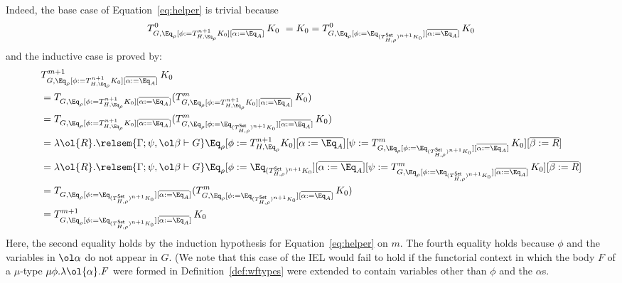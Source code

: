 \documentclass{lmcs}
\theoremstyle{plain}\newtheorem{satz}[thm]{Satz}
\newcommand{\set}{\mathsf{Set}}
\begin{document}
\begin{itemize}
\begin{itemize}
Indeed, the base case of Equation~\ref{eq:helper} is trivial because
\[T^0_{G,
  \Eq_{\rho}[\phi := T^{n+1}_{H,\Eq_{\rho}} K_0][\overline{\alpha :=
      \Eq_A}]}\,K_0 \ = K_0 = T^0_{G, \Eq_{\rho}[\phi :=
    \Eq_{(T^{\set}_{H,\rho})^{n+1} K_0}][\overline{\alpha :=
      \Eq_A}]}\,K_0\]
and the inductive case is proved by: \\
\begin{align*}
& T^{m+1}_{G, \Eq_{\rho}[\phi := T^{n+1}_{H,\Eq_{\rho}} K_0][\overline{\alpha := \Eq_A}]}\,K_0 \\
&= T_{G, \Eq_{\rho}[\phi := T^{n+1}_{H,\Eq_{\rho}} K_0][\overline{\alpha
        := \Eq_A}]} (T^{m}_{G, \Eq_{\rho}[\phi := T^{n+1}_{H,\Eq_{\rho}}
      K_0][\overline{\alpha := \Eq_A}]}\,K_0) \\
&= T_{G, \Eq_{\rho}[\phi := T^{n+1}_{H,\Eq_{\rho}} K_0][\overline{\alpha
        := \Eq_A}]} (T^{m}_{G, \Eq_{\rho}[\phi :=
      \Eq_{(T^{\set}_{H,\rho})^{n+1} K_0}][\overline{\alpha :=
        \Eq_A}]}\,K_0) \\
&= \lambda \ol{R}. \relsem{\Gamma; \psi,
    \ol\beta \vdash G} \Eq_{\rho} [\phi := T^{n+1}_{H,\Eq_{\rho}}
    K_0][\overline{\alpha := \Eq_A}][\psi := T^{m}_{G, \Eq_{\rho}[\phi
        := \Eq_{(T^{\set}_{H,\rho})^{n+1} K_0}][\overline{\alpha :=
          \Eq_A}]}\,K_0][\overline{\beta := R}] \\
&= \lambda \ol{R}. \relsem{\Gamma; \psi,
    \ol\beta \vdash G} \Eq_{\rho} [\phi := \Eq_{(T^{\set}_{H,\rho})^{n+1}
      K_0}][\overline{\alpha := \Eq_A}][\psi := T^{m}_{G,
      \Eq_{\rho}[\phi := \Eq_{(T^{\set}_{H,\rho})^{n+1}
          K_0}][\overline{\alpha := \Eq_A}]}\,K_0][\overline{\beta :=
      R}] \\
&= T_{G, \Eq_{\rho}[\phi := \Eq_{(T^{\set}_{H,\rho})^{n+1}
        K_0}][\overline{\alpha := \Eq_A}]} (T^{m}_{G, \Eq_{\rho}[\phi
      := \Eq_{(T^{\set}_{H,\rho})^{n+1} K_0}][\overline{\alpha :=
        \Eq_A}]}\,K_0) \\
&= T^{m+1}_{G, \Eq_{\rho}[\phi := \Eq_{(T^{\set}_{H,\rho})^{n+1}
        K_0}][\overline{\alpha := \Eq_A}]}\,K_0
\end{align*}
Here, the second equality holds by the induction hypothesis for
Equation~\ref{eq:helper} on $m$. The fourth equality holds because
$\phi$ and the variables in $\ol\alpha$ do not appear in $G$. (We note
that this case of the IEL would fail to hold if the functorial context
in which the body $F$ of a $\mu$-type $\mu \phi. \lambda
\ol{\alpha}. F$ were formed in Definition~\ref{def:wftypes} were
extended to contain variables other than $\phi$ and the $\alpha$s.

\end{itemize}
\end{itemize}
\end{document}
